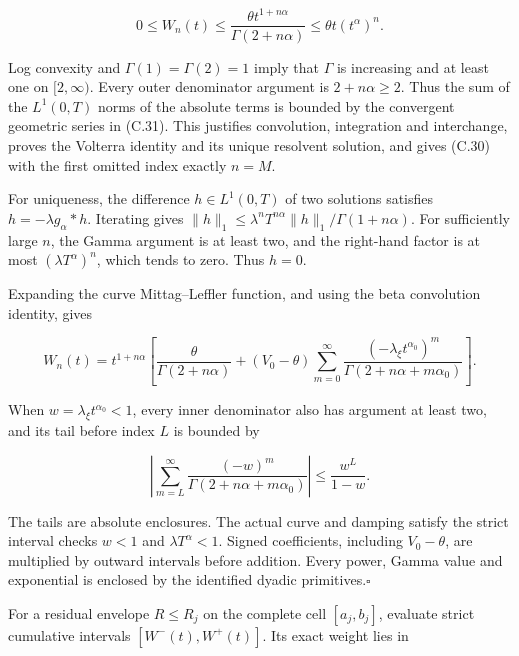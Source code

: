 \documentclass[11pt,a4paper]{article}
\newcommand{\proofend}{\hfill\(\square\)\par\addvspace{0.6\baselineskip}}
\begin{document}
\begin{equation*}\tag{C.31}
0\le W_n(t)\le
\frac{\theta t^{1+n\alpha}}{\Gamma(2+n\alpha)}
\le\theta t(t^\alpha)^n.
\end{equation*}

Log convexity and \(\Gamma(1)=\Gamma(2)=1\) imply that \(\Gamma\) is increasing and at least one on \([2,\infty)\). Every outer denominator argument is \(2+n\alpha\ge2\). Thus the sum of the \(L^1(0,T)\) norms of the absolute terms is bounded by the convergent geometric series in (C.31). This justifies convolution, integration and interchange, proves the Volterra identity and its unique resolvent solution, and gives (C.30) with the first omitted index exactly \(n=M\).

For uniqueness, the difference \(h\in L^1(0,T)\) of two solutions satisfies \(h=-\lambda g_\alpha*h\). Iterating gives \(\|h\|_1\le\lambda^nT^{n\alpha}\|h\|_1/\Gamma(1+n\alpha)\). For sufficiently large \(n\), the Gamma argument is at least two, and the right-hand factor is at most \((\lambda T^\alpha)^n\), which tends to zero. Thus \(h=0\).

Expanding the curve Mittag–Leffler function, and using the beta convolution identity, gives

\begin{equation*}\tag{C.32}
W_n(t)=t^{1+n\alpha}
\left[
\frac{\theta}{\Gamma(2+n\alpha)}
+(V_0-\theta)\sum_{m=0}^{\infty}
\frac{(-\lambda_\xi t^{\alpha_0})^m}
{\Gamma(2+n\alpha+m\alpha_0)}
\right].
\end{equation*}

When \(w=\lambda_\xi t^{\alpha_0}<1\), every inner denominator also has argument at least two, and its tail before index \(L\) is bounded by

\begin{equation*}\tag{C.33}
\left|\sum_{m=L}^{\infty}
\frac{(-w)^m}{\Gamma(2+n\alpha+m\alpha_0)}\right|
\le \frac{w^L}{1-w}.
\end{equation*}

The tails are absolute enclosures. The actual curve and damping satisfy the strict interval checks \(w<1\) and \(\lambda T^\alpha<1\). Signed coefficients, including \(V_0-\theta\), are multiplied by outward intervals before addition. Every power, Gamma value and exponential is enclosed by the identified dyadic primitives.\proofend

For a residual envelope \(R\le R_j\) on the complete cell \([a_j,b_j]\), evaluate strict cumulative intervals \([W^-(t),W^+(t)]\). Its exact weight lies in
\end{document}
